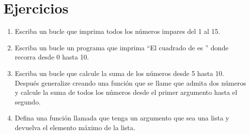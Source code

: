 
\section*{Ejercicios}

\begin{enumerate}
		
	\item Escriba un bucle  que imprima todos los
		números impares del 1 al 15.
		
	\item Escriba un bucle  un programa que imprima
		``El cuadrado de  es '' donde
		 recorra desde 0 hasta 10.

	\item Escriba un bucle  que calcule la suma de los
		números desde 5 hasta 10. Después generalize creando una función
		que se llame  que admita dos números y
		calcule la suma de todos los números desde el primer argumento hasta
		el segundo.

	\item Defina una función llamada  que tenga un
		argumento que sea una lista y devuelva el elemento máximo de la lista.

\end{enumerate}
